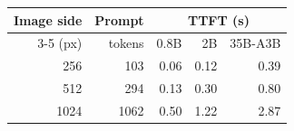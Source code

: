 \begin{tabular}{@{}rrrrr@{}}
\toprule
Image side & Prompt & \multicolumn{3}{c}{TTFT (s)} \\
\cmidrule(l){3-5}
(px) & tokens & 0.8B & 2B & 35B-A3B \\
\midrule
256 & 103 & 0.06 & 0.12 & 0.39 \\
512 & 294 & 0.13 & 0.30 & 0.80 \\
1024 & 1062 & 0.50 & 1.22 & 2.87 \\
\bottomrule
\end{tabular}
